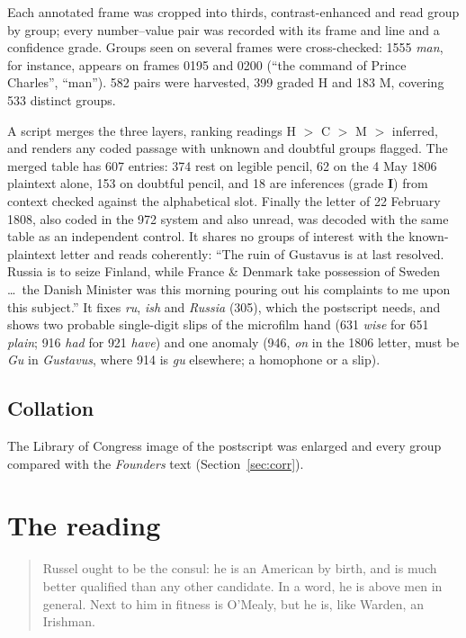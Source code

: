 \documentclass[]{interact}
\newcommand{\grp}[1]{\textsf{#1}}
\begin{document}
Each annotated frame was cropped into thirds, contrast-enhanced and read group by group; every number--value pair was recorded with its frame and line and a confidence grade. Groups seen on several frames were cross-checked: \grp{1555} \emph{man}, for instance, appears on frames 0195 and 0200 (``the command of Prince Charles'', ``man''). 582 pairs were harvested, 399 graded H and 183 M, covering 533 distinct groups.

A script merges the three layers, ranking readings H $>$ C $>$ M $>$ inferred, and renders any coded passage with unknown and doubtful groups flagged. The merged table has 607 entries: 374 rest on legible pencil, 62 on the 4 May 1806 plaintext alone, 153 on doubtful pencil, and 18 are inferences (grade \textbf{I}) from context checked against the alphabetical slot. Finally the letter of 22 February 1808, also coded in the 972 system and also unread, was decoded with the same table as an independent control. It shares no groups of interest with the known-plaintext letter and reads coherently: ``The ruin of Gustavus is at last resolved. Russia is to seize Finland, while France \& Denmark take possession of Sweden \ldots\ the Danish Minister was this morning pouring out his complaints to me upon this subject.'' It fixes \emph{ru}, \emph{ish} and \emph{Russia} (\grp{305}), which the postscript needs, and shows two probable single-digit slips of the microfilm hand (\grp{631} \emph{wise} for \grp{651} \emph{plain}; \grp{916} \emph{had} for \grp{921} \emph{have}) and one anomaly (\grp{946}, \emph{on} in the 1806 letter, must be \emph{Gu} in \emph{Gustavus}, where \grp{914} is \emph{gu} elsewhere; a homophone or a slip).

\subsection{Collation}

The Library of Congress image of the postscript was enlarged and every group compared with the \emph{Founders} text (Section~\ref{sec:corr}).

\section{The reading}\label{sec:reading}

\begin{quote}
Russel ought to be the consul: he is an American by birth, and is much better qualified than any other candidate. In a word, he is above men in general. Next to him in fitness is O'Mealy, but he is, like Warden, an Irishman.
\end{quote}
\end{document}
